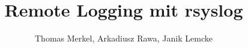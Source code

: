 \documentclass[a4paper,12pt,onehalfspacing]{article}
\title{Remote Logging mit rsyslog}
\author{Thomas Merkel, Arkadiusz Rawa, Janik Lemcke}
\begin{document}
	\maketitle
	
	\newpage
	\tableofcontents
	\newpage
	
	\newpage
	
	\newpage
	
	\newpage
	\nocite{*}
	
	
\end{document}
